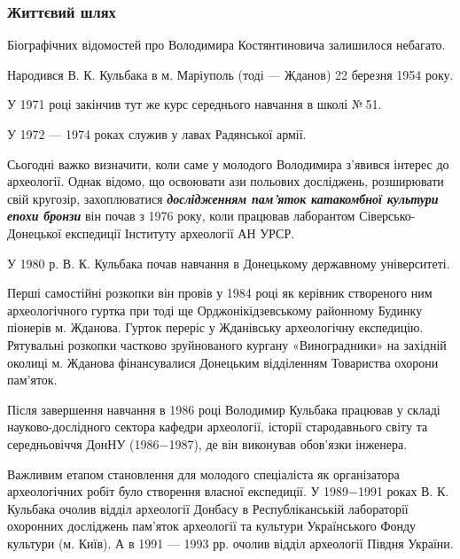  
 
 
 
 

\subsubsection{Життєвий шлях}


Біографічних відомостей про Володимира Костянтиновича залишилося небагато.

Народився В. К. Кульбака в м. Маріуполь (тоді — Жданов) 22 березня 1954 року.

У 1971 році закінчив тут же курс середнього навчання в школі № 51.

У 1972 — 1974 роках служив у лавах Радянської армії.

Сьогодні важко визначити, коли саме у молодого Володимира з'явився інтерес до
археології. Однак відомо, що освоювати ази польових досліджень, розширювати
свій кругозір, захоплюватися \emph{\textbf{дослідженням пам'яток катакомбної культури епохи
бронзи}} він почав з 1976 року, коли працював лаборантом Сіверсько-Донецької
експедиції Інституту археології АН УРСР.

У 1980 р. В. К. Кульбака почав навчання в Донецькому державному університеті.

Перші самостійні розкопки він провів у 1984 році як керівник створеного ним
археологічного гуртка при тоді ще Орджонікідзевському районному Будинку
піонерів м. Жданова. Гурток переріс у Жданівську археологічну експедицію.
Рятувальні розкопки частково зруйнованого кургану «Виноградники» на західній
околиці м. Жданова фінансувалися Донецьким відділенням Товариства охорони
пам'яток.

Після завершення навчання в 1986 році Володимир Кульбака працював у складі
науково-дослідного сектора кафедри археології, історії стародавнього світу та
середньовіччя ДонНУ (1986−1987), де він виконував обов'язки інженера.

Важливим етапом становлення для молодого спеціаліста як організатора
археологічних робіт було створення власної експедиції. У 1989−1991 роках В. К.
Кульбака очолив відділ археології Донбасу в Республіканській лабораторії
охоронних досліджень пам'яток археології та культури Українського Фонду
культури (м. Київ). А в 1991 — 1993 рр. очолив відділ археології Півдня
України.


